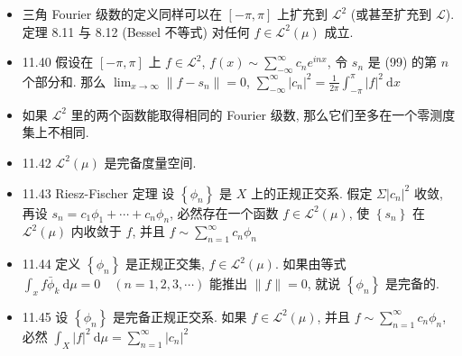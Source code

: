 \begin{itemize}
\item 三角 Fourier 级数的定义同样可以在 $[-\pi, \pi]$ 上扩充到 $\mathscr{L}^{2}$ (或甚至扩充到 $\mathscr{L}$). 定理 8.11 与 8.12 (Bessel 不等式) 对任何 $f \in \mathscr{L}^{2}(\mu)$ 成立.

\item 11.40 假设在 $[-\pi, \pi]$ 上 $f \in \mathscr{L}^{2}$, $f(x) \sim \sum_{-\infty}^{\infty} c_{n} e^{i n x}$, 令 $s_{n}$ 是 (99) 的第 $n$ 个部分和. 那么 $\lim _{x \rightarrow \infty}\left\|f-s_{n}\right\|=0$, $\sum_{-\infty}^{\infty}\left|c_{n}\right|^{2}=\frac{1}{2 \pi} \int_{-\pi}^{\pi}|f|^{2} \mathrm{~d} x$

\item 如果 $\mathscr{L}^{2}$ 里的两个函数能取得相同的 Fourier 级数, 那么它们至多在一个零测度集上不相同.

\item 11.42 $\mathscr{L}^{2}(\mu)$ 是完备度量空间.

\item 11.43 Riesz-Fischer 定理 设 $\left\{\phi_{n}\right\}$ 是 $X$ 上的正规正交系. 假定 $\Sigma\left|c_{n}\right|^{2}$ 收敛, 再设 $s_{n}=c_{1} \phi_{1}+\cdots+c_{n} \phi_{n}$, 必然存在一个函数 $f \in \mathscr{L}^{2}(\mu)$, 使 $\left\{s_{n}\right\}$ 在 $\mathscr{L}^{2}(\mu)$ 内收敛于 $f$, 并且 $f \sim \sum_{n=1}^{\infty} {c}_{n} \phi_{n}$

\item 11.44 定义 $\left\{\phi_{n}\right\}$ 是正规正交集, $f \in \mathscr{L}^{2}(\mu)$. 如果由等式 $\int_{x} f \bar{\phi}_{k} \mathrm{~d} \mu=0 \quad(n=1,2,3, \cdots)$ 能推出 $\|f\|=0$, 就说 $\left\{\phi_{n}\right\}$ 是完备的.

\item 11.45 设 $\left\{\phi_{n}\right\}$ 是完备正规正交系. 如果 $f \in \mathscr{L}^{2}(\mu)$, 并且 $f \sim \sum_{n=1}^{\infty} c_{n} \phi_{n}$, 必然 $\int_{X}|f|^{2} \mathrm{~d} \mu=\sum_{n=1}^{\infty}\left|c_{n}\right|^{2}$

\end{itemize}
